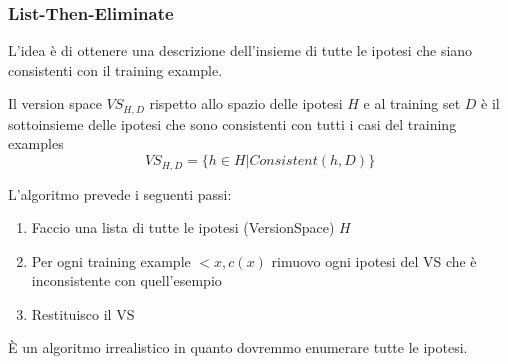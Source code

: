 \subsubsection{List-Then-Eliminate}
L'idea è di ottenere una descrizione dell'insieme di tutte le ipotesi che siano consistenti con il training example.
\begin{definition}
	Il version space $VS_{H,D}$ rispetto allo spazio delle ipotesi $H$ e al training set $D$ è il sottoinsieme delle ipotesi che sono consistenti con tutti i casi del training examples
	\begin{equation}
		VS_{H,D}=\{h \in H \vert Consistent(h,D)\}
	\end{equation}
\end{definition}
L'algoritmo prevede i seguenti passi:
\begin{enumerate}
	\item Faccio una lista di tutte le ipotesi (VersionSpace) $H$
	\item Per ogni training example $<x,c(x)$ rimuovo ogni ipotesi del VS che è inconsistente con quell'esempio
	\item Restituisco il VS
\end{enumerate}
È un algoritmo irrealistico in quanto dovremmo enumerare tutte le ipotesi.
